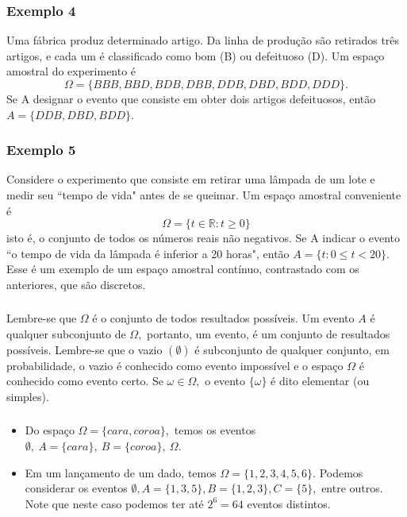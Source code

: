 \documentclass[14pt,aspectratio=1610]{beamer}
\begin{document}
\begin{frame}{}
\frametitle{Exemplo 4}
\begin{block}{}
\justifying
Uma fábrica produz determinado artigo. Da linha de produção são retirados
três artigos, e cada um é classificado como bom (B) ou defeituoso (D). Um
espaço amostral do experimento é
$$\Omega = \{BBB, BBD, BDB, DBB, DDB, DBD, BDD, DDD\}.$$
Se A designar o evento que consiste em obter dois artigos defeituosos, então
$A = \{DDB, DBD, BDD\}.$
\end{block}
\end{frame}

\begin{frame}{}
\frametitle{Exemplo 5}
\begin{block}{}
\justifying
Considere o experimento que consiste em retirar uma lâmpada de um lote e medir seu ``tempo de vida" antes de se queimar. Um espaço amostral conveniente é
$$\Omega=\{t\in \mathds{R}:t\geq 0\}$$
isto é, o conjunto de todos os números reais não negativos. Se A indicar o evento ``o
tempo de vida da lâmpada é inferior a 20 horas", então $A = \{t : 0\leq t<20\}.$ Esse é um exemplo de um espaço amostral contínuo, contrastado com os anteriores, que
são discretos.
\end{block}
\end{frame}

\begin{frame}{}
\frametitle{}
\begin{block}{}
\justifying
Lembre-se que $\Omega$ é o conjunto de todos resultados possíveis. Um evento $A$ é qualquer subconjunto de $\Omega,$ portanto, um evento, é um conjunto de resultados possíveis. Lembre-se que o vazio $(\emptyset)$ é subconjunto de qualquer conjunto, em probabilidade, o vazio é conhecido como evento impossível e o espaço $\Omega$ é conhecido como evento certo. Se $\omega \in \Omega,$ o evento $\{\omega\}$ é dito elementar (ou simples).
\end{block}
\end{frame}

\begin{frame}{}
\frametitle{}
\begin{block}{}
\justifying
\begin{itemize}
\item Do espaço $\Omega=\{cara, coroa\},$ temos os eventos $\emptyset,\ A=\{cara\},\ B=\{coroa\},\ \Omega.$ \pause
\item Em um lançamento de um dado, temos $\Omega=\{1,2,3,4,5,6\}.$ Podemos considerar os eventos $\emptyset, A=\{1,3,5\}, B=\{1,2,3\}, C=\{5\},$ entre outros. Note que neste caso podemos ter até $2^{6}=64$ eventos distintos.
\end{itemize}
\end{block}
\end{frame}
\end{document}
